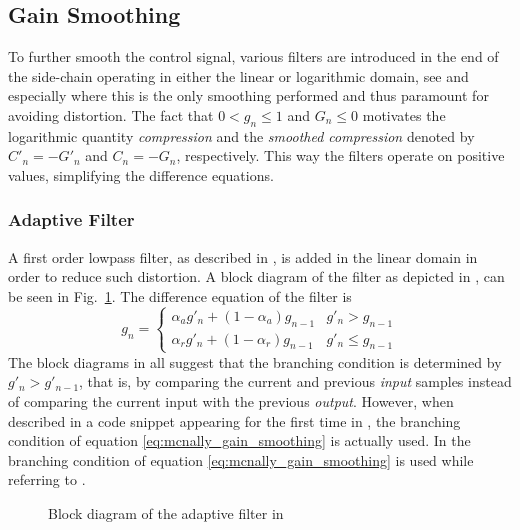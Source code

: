 \documentclass[../main2.tex]{subfiles}
\providecommand{\rootdir}{..}
\begin{document}
\FloatBarrier
\subsection{Gain Smoothing}
To further smooth the control signal, various filters are introduced in the end of the side-chain operating in either the linear or logarithmic domain, see \cite{mcnally1984dynamic}\cite{frindle1996implementation} and especially \cite{reiss2012tutorial} where this is the only smoothing performed and thus paramount for avoiding distortion. The fact that $0< g_n\leq 1$ and $G_n \leq 0$ motivates the logarithmic quantity \emph{compression} and the \emph{smoothed compression}  denoted by $C'_n = -G'_n$ and  $C_n = -G_n$, respectively. This way the filters operate on positive values, simplifying the difference equations.
\subsubsection{Adaptive Filter} \label{adaptive_filter}
A first order lowpass filter, as described in \cite{mcnally1984}, is added in the linear domain in order to reduce such distortion. A block diagram of the filter as depicted in \cite{mcnally1984dynamic}, can be seen in Fig.~\ref{fig:block_mcnally_theory_adap_filter}. The difference equation of the filter is
\begin{equation}
g_n = \begin{cases}
    \alpha_{a} g'_n + (1-\alpha_{a}) g_{n-1} 	& g'_n > g_{n-1} \\
    \alpha_{r} g'_n + (1-\alpha_{r}) g_{n-1} 	& g'_n \leq g_{n-1}
\end{cases}
\label{eq:mcnally_gain_smoothing}
\end{equation}
The block diagrams in \cite{mcnally1984dynamic}\cite{dafx02}\cite{dafx11}\cite{zolzer1997digital}\cite{zolzer2008digital} all suggest that the branching condition is determined by $g'_n > g'_{n-1}$, that is, by comparing the current and previous \emph{input} samples instead of comparing the current input with the previous \emph{output}. However, when described in a code snippet appearing for the first time in \cite{dafx11}, the branching condition of equation \eqref{eq:mcnally_gain_smoothing} is actually used. In \cite{bitzer2006parameter} the branching condition of equation \eqref{eq:mcnally_gain_smoothing} is used while referring to \cite{mcnally1984dynamic}\cite{dafx02}.
\begin{figure}
\centerline{}
\caption{Block diagram of the adaptive filter in \cite{mcnally1984dynamic}}
\label{fig:block_mcnally_theory_adap_filter}
\end{figure}
\end{document}
